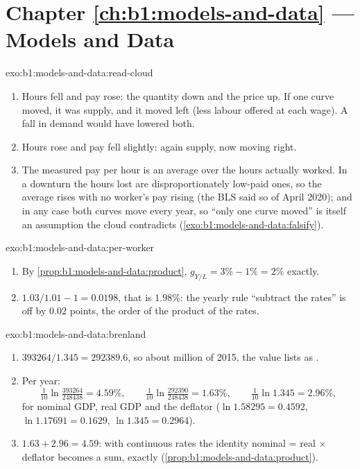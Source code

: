 \section*{Chapter \ref{ch:b1:models-and-data} --- Models and Data}

\begin{solution}{exo:b1:models-and-data:read-cloud}
\begin{enumerate}
  \item Hours fell and pay rose: the quantity down and the price up. If one
    curve moved, it was supply, and it moved left (less labour offered at
    each wage). A fall in demand would have lowered both.
  \item Hours rose and pay fell slightly: again supply, now moving right.
  \item The measured pay per hour is an average over the hours actually
    worked. In a downturn the hours lost are disproportionately low-paid
    ones, so the average rises with no worker's pay rising (the BLS said so
    of April 2020); and in any case both curves move every year, so ``only
    one curve moved'' is itself an assumption the cloud contradicts
    (\cref{exo:b1:models-and-data:falsify}).
\end{enumerate}
\end{solution}

\begin{solution}{exo:b1:models-and-data:per-worker}
\begin{enumerate}
  \item By \cref{prop:b1:models-and-data:product}, $g_{Y/L} = 3\% - 1\% = 2\%$ exactly.
  \item $1.03/1.01 - 1 = 0.0198$, that is $1.98\%$: the yearly rule ``subtract
    the rates'' is off by $0.02$ points, the order of the product of the rates.
\end{enumerate}
\end{solution}

\begin{solution}{exo:b1:models-and-data:brenland}
\begin{enumerate}
  \item $393264/1.345 = 292389.6$, so about  million of 2015, the
    value  lists as .
  \item Per year:
    \[
    \tfrac{1}{10}\ln\tfrac{393264}{248438} = 4.59\%, \qquad
    \tfrac{1}{10}\ln\tfrac{292390}{248438} = 1.63\%, \qquad
    \tfrac{1}{10}\ln 1.345 = 2.96\%,
    \]
    for nominal GDP, real GDP and the deflator ($\ln 1.58295 = 0.4592$,
    $\ln 1.17691 = 0.1629$, $\ln 1.345 = 0.2964$).
  \item $1.63 + 2.96 = 4.59$: with continuous rates the identity
    nominal = real $\times$ deflator becomes a sum, exactly
    (\cref{prop:b1:models-and-data:product}).
\end{enumerate}
\end{solution}

